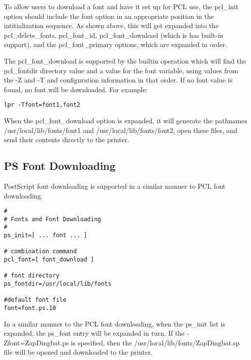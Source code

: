 \documentclass[a4paper]{article}
\begin{document}
To allow users to download a font and have it set up for PCL use,
the 
{\ttfamily pcl\_init}
option should include the
{\ttfamily font}
option in an appropriate position in the intitialization sequence.
As shown above,
this will get expanded into the
{\ttfamily pcl\_delete\_fonts},
{\ttfamily pcl\_font\_id},
{\ttfamily pcl\_font\_download} (which is has built-in support),
and the
{\ttfamily pcl\_font\_primary}
options,
which are expanded in order.

The
{\ttfamily pcl\_font\_download} is supported by the builtin operation which will
find the
{\ttfamily pcl\_fontdir}
directory value
and a value for the
{\ttfamily font}
variable,
using values from the
{\ttfamily -Z}
and
{\ttfamily -T}
and configuration information in that order.
If no
{\ttfamily font}
value is found,
no font will be downloaded.
For example:
\begin{tscreen}
\begin{verbatim}
lpr -Tfont=font1,font2
\end{verbatim}
\end{tscreen}


When the
{\ttfamily pcl\_font\_download}
option is expanded,
it will generate the pathnames
{\ttfamily /usr/local/lib/fonts/font1}
and
{\ttfamily /usr/local/lib/fonts/font2},
open these files,
and send their contents directly to the printer.


\subsection{PS Font Downloading}

PostScript font downloading is supported in a similar manner to
PCL font downloading.
\begin{tscreen}
\begin{verbatim}
#
# Fonts and Font Downloading
# 
ps_init=[ ... font ... ]

# combination command
pcl_font=[ font_download ]

# font directory
ps_fontdir=/usr/local/lib/fonts

#default font file
font=font.ps.10
\end{verbatim}
\end{tscreen}


In a similar manner to the PCL font downloading,
when the
{\ttfamily ps\_init}
list is expanded,
the
{\ttfamily ps\_font}
entry will be expanded in turn.
If the {\ttfamily -Zfont=ZapDingbat.ps} is specified,
then the
{\ttfamily /usr/local/lib/fonts/ZapDingbat.sp}
file will be opened and downloaded to the printer.
\end{document}
